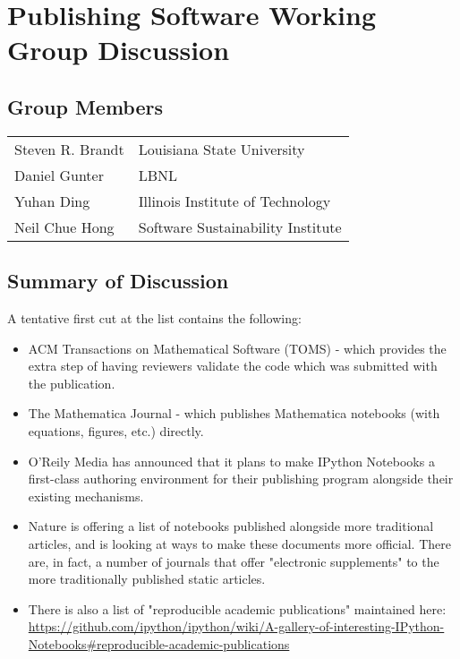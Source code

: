 \section{Publishing Software Working Group Discussion}
\label{sec:appendix_publishing_SW}

\subsection{Group Members}
{\small
\begin{longtable}{ll}
   Steven R. Brandt & Louisiana State University
\\ Daniel Gunter    & LBNL
\\ Yuhan Ding       & Illinois Institute of Technology
\\ Neil Chue Hong   & Software Sustainability Institute
\end{longtable}
}

\subsection{Summary of Discussion}

A tentative first cut at the list contains the following:
\begin{itemize}
\item ACM Transactions on Mathematical Software (TOMS) - which provides the extra step
 of having reviewers validate the code which was submitted with the publication.
\item The Mathematica Journal - which publishes Mathematica notebooks (with equations,
figures, etc.) directly.
\item O'Reily Media has announced that it plans to make IPython Notebooks a first-class
 authoring environment for their publishing program alongside their existing mechanisms.
\item Nature is offering a list of notebooks published alongside more traditional articles,
 and is looking at ways to make these documents more official. There are, in fact, a
 number of journals that offer "electronic supplements" to the more traditionally published
 static articles.
\item There is also a list of "reproducible academic publications" maintained here:
  \url{https://github.com/ipython/ipython/wiki/A-gallery-of-interesting-IPython-Notebooks#reproducible-academic-publications}
\end{itemize}

